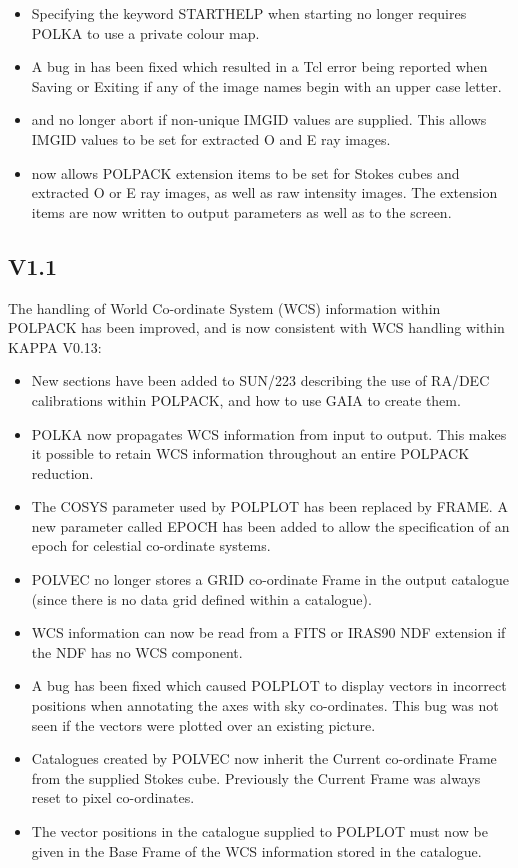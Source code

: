\documentclass[twoside,11pt]{starlink}
\begin{document}
\begin{itemize}
\item Specifying the keyword STARTHELP when starting 
no longer requires POLKA to use a private colour map.

\item A bug in  has been fixed which resulted in a
Tcl error being reported when Saving or Exiting if any of the image names
begin with an upper case letter.

\item {} and  no longer abort
if non-unique IMGID values are supplied. This allows IMGID values to be set
for  extracted O and E ray images.

\item {} now allows POLPACK extension items to be
set for Stokes cubes and extracted O or E ray images, as well as raw
intensity images. The extension items are now written to output
parameters as well as to the screen.

\end{itemize}



\subsection{V1.1}
The handling of World Co-ordinate System (WCS) information within POLPACK
has been improved, and is now consistent with WCS handling within KAPPA
V0.13:

\begin{itemize}
\item New sections have been added to SUN/223 describing the use of
RA/DEC calibrations within POLPACK, and how to use GAIA to create them.
\item POLKA now propagates WCS information from input to output. This makes
it possible to retain WCS information throughout an entire POLPACK
reduction.
\item The COSYS parameter used by POLPLOT has been replaced by FRAME.
A new parameter called EPOCH has been added to allow the specification of
an epoch for celestial co-ordinate systems.
\item POLVEC no longer stores a GRID co-ordinate Frame in the output
catalogue (since there is no data grid defined within a catalogue).
\item WCS information can now be read from a FITS or IRAS90 NDF extension
if the NDF has no WCS component.
\item A bug has been fixed which caused POLPLOT to display vectors in
incorrect positions when annotating the axes with sky co-ordinates. This bug
was not seen if the vectors were plotted over an existing picture.
\item Catalogues created by POLVEC now inherit the Current co-ordinate Frame
from the supplied Stokes cube. Previously the Current Frame was always reset to
pixel co-ordinates.
\item The vector positions in the catalogue supplied to POLPLOT must now
be given in the Base Frame of the WCS information stored in the catalogue.
\end{itemize}
\end{document}
